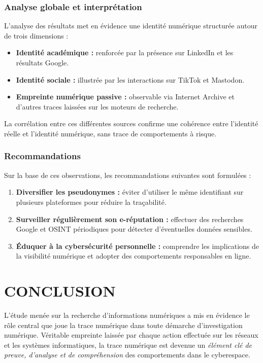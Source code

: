 \documentclass[memoire,12pt]{report}
\begin{document}
\subsection{Analyse globale et interprétation}

L’analyse des résultats met en évidence une identité numérique structurée autour de trois dimensions :

\begin{itemize}
    \item \textbf{Identité académique :} renforcée par la présence sur LinkedIn et les résultats Google.
    \item \textbf{Identité sociale :} illustrée par les interactions sur TikTok et Mastodon.
    \item \textbf{Empreinte numérique passive :} observable via Internet Archive et d’autres traces laissées sur les moteurs de recherche.
\end{itemize}

La corrélation entre ces différentes sources confirme une cohérence entre l’identité réelle et l’identité numérique, sans trace de comportements à risque.

\subsection{Recommandations}

Sur la base de ces observations, les recommandations suivantes sont formulées :

\begin{enumerate}
    \item \textbf{Diversifier les pseudonymes :} éviter d’utiliser le même identifiant sur plusieurs plateformes pour réduire la traçabilité.
    \item \textbf{Surveiller régulièrement son e-réputation :} effectuer des recherches Google et OSINT périodiques pour détecter d’éventuelles données sensibles.
    \item \textbf{Éduquer à la cybersécurité personnelle :} comprendre les implications de la visibilité numérique et adopter des comportements responsables en ligne.
\end{enumerate}
\chapter*{CONCLUSION}

L’étude menée sur la recherche d’informations numériques a mis en évidence le rôle central que joue la trace numérique dans toute démarche d’investigation numérique. Véritable empreinte laissée par chaque action effectuée sur les réseaux et les systèmes informatiques, la trace numérique est devenue un \textit{élément clé de preuve, d’analyse et de compréhension} des comportements dans le cyberespace.\\
\end{document}
